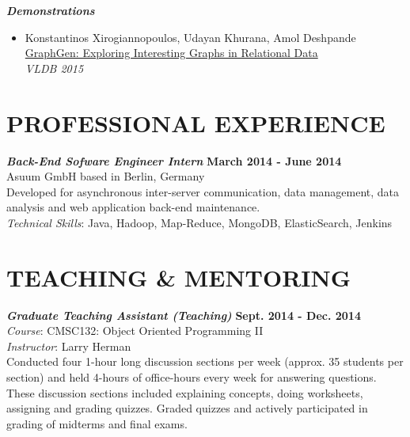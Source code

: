 \documentclass[margin, 10pt]{res} %
\begin{document}
\begin{resume}
{\sl \textbf{Demonstrations} }\\
\begin{itemize}
  \item Konstantinos Xirogiannopoulos, Udayan Khurana, Amol Deshpande\\
  \href{http://www.vldb.org/pvldb/vol8/p2032-xirogiannopoulos.pdf}{GraphGen: Exploring Interesting Graphs in Relational Data}\\
  \textit{VLDB 2015}
\end{itemize}


\section{PROFESSIONAL EXPERIENCE}

{\sl \textbf{Back-End Sofware Engineer Intern} } \hfill \textbf{March 2014 - June 2014}\\
Asuum GmbH based in Berlin, Germany\\
Developed for asynchronous inter-server communication, data management, data analysis and web application back-end maintenance.\\
\textit{Technical Skills}: Java, Hadoop, Map-Reduce, MongoDB, ElasticSearch, Jenkins


\section{TEACHING \& MENTORING}

{\sl \textbf{Graduate Teaching Assistant (Teaching)}} \hfill \textbf{Sept. 2014 - Dec. 2014}\\
\textit{Course}: CMSC132: Object Oriented Programming II \\
\textit{Instructor}: Larry Herman\\
Conducted four 1-hour long discussion sections per week (approx. 35 students per section) and held 4-hours of office-hours every week for answering questions. These discussion sections included explaining concepts, doing worksheets, assigning and grading quizzes. Graded quizzes and actively participated in grading of midterms and final exams.




\end{resume}
\end{document}
